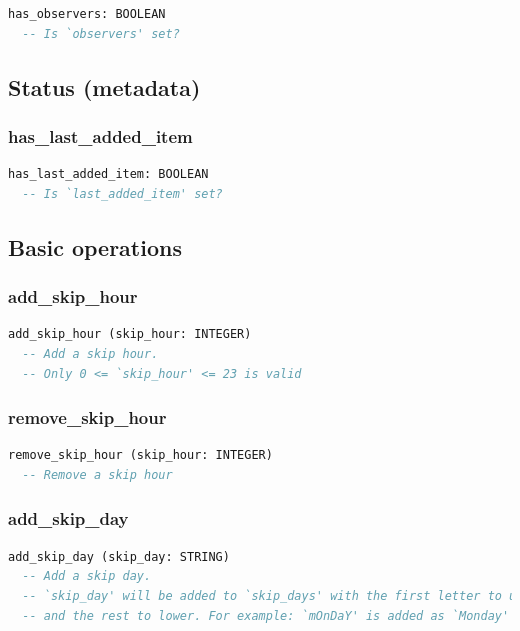 \begin{lstlisting}[language=Eiffel]
has_observers: BOOLEAN
  -- Is `observers' set?
\end{lstlisting}


\subsection{Status (metadata)}
\label{sec:channel-status-metadata}

\subsubsection{has\_last\_added\_item}

\begin{lstlisting}[language=Eiffel]
has_last_added_item: BOOLEAN
  -- Is `last_added_item' set?
\end{lstlisting}

\subsection{Basic operations}
\label{sec:channel-basic-operations}

\subsubsection{add\_skip\_hour}

\begin{lstlisting}[language=Eiffel]
add_skip_hour (skip_hour: INTEGER)
  -- Add a skip hour.
  -- Only 0 <= `skip_hour' <= 23 is valid
\end{lstlisting}

\subsubsection{remove\_skip\_hour}

\begin{lstlisting}[language=Eiffel]
remove_skip_hour (skip_hour: INTEGER)
  -- Remove a skip hour
\end{lstlisting}

\subsubsection{add\_skip\_day}

\begin{lstlisting}[language=Eiffel]
add_skip_day (skip_day: STRING)
  -- Add a skip day.
  -- `skip_day' will be added to `skip_days' with the first letter to upper
  -- and the rest to lower. For example: `mOnDaY' is added as `Monday'
\end{lstlisting}

